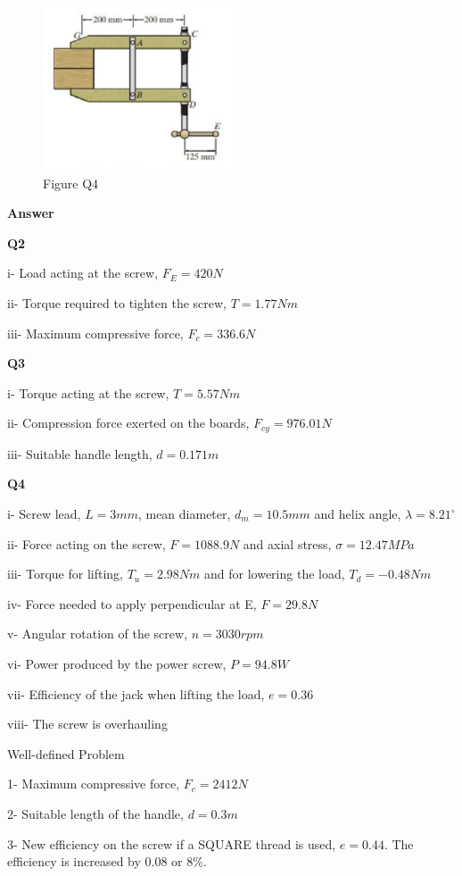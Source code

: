 \documentclass[a4paper, fleqn]{article}
\begin{document}
\begin{figure}[h]
    \centering
    \includegraphics[width=0.5\textwidth]{t2-q4.png}
    \caption{Figure Q4}
\end{figure}

\newpage

\textbf{Answer}
\vspace{10pt}

\textbf{Q2}

i- Load acting at the screw, $F_E=420N$

ii- Torque required to tighten the screw, $T=1.77Nm$

iii- Maximum compressive force, $F_c=336.6N$

\vspace{10pt}
\textbf{Q3}

i- Torque acting at the screw, $T=5.57Nm$

ii- Compression force exerted on the boards, $F_{cy}=976.01N$

iii- Suitable handle length, $d=0.171m$

\vspace{10pt}
\textbf{Q4}

i- Screw lead, $L=3mm$, mean diameter, $d_m=10.5mm$ and helix angle, $\lambda=8.21^{\circ}$

ii- Force acting on the screw, $F=1088.9N$ and axial stress, $\sigma=12.47MPa$

iii- Torque for lifting, $T_u=2.98Nm$ and for lowering the load, $T_d=-0.48Nm$

iv- Force needed to apply perpendicular at E, $F=29.8N$

v- Angular rotation of the screw, $n=3030rpm$

vi- Power produced by the power screw, $P=94.8W$

vii- Efficiency of the jack when lifting the load, $e=0.36$

viii- The screw is overhauling

\vspace{10pt}
Well-defined Problem

1- Maximum compressive force, $F_c=2412N$

2- Suitable length of the handle, $d=0.3m$

3- New efficiency on the screw if a SQUARE thread is used, $e=0.44$. The efficiency is increased by 0.08 or 8\%.
\end{document}
